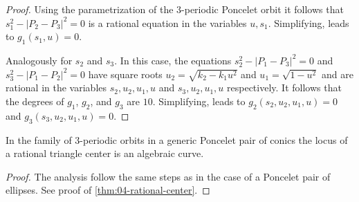 \begin{proof}
Using the parametrization of the 3-periodic Poncelet orbit it follows that $s_1^2-|P_2-P_3|^2=0$ is a rational equation in the variables $u,s_1$. Simplifying, leads to $g_1(s_1,u)=0.$

Analogously for $s_2$ and $s_3$. In this case, the equations $s_2^2-|P_1-P_3|^2=0$ and  $s_3^2-|P_1-P_2|^2=0$   have   square roots $u_2=\sqrt{k_2-k_1 u^2}$ and $u_1=\sqrt{1-u^2}$ and  are rational in the variables $s_2,u_2,u_1,u$ and $s_3,u_2,u_1,u$ respectively. It follows that the degrees of $g_1$, $g_2$, and $g_3$ are $10$.  Simplifying, leads to $g_2(s_2,u_2,u_1,u)=0 $ and $g_3(s_3,u_2,u_1,u)=0$. 
\end{proof}


 \begin{theorem}\label{thm:loci_algebraic_general}
 In the family of 3-periodic orbits in a generic Poncelet pair of conics the locus of a rational triangle center is an algebraic curve. 
 \end{theorem}

 \begin{proof}
 The analysis follow the same steps as in the case of a Poncelet pair of ellipses.  See proof of \cref{thm:04-rational-center}. 
\end{proof}